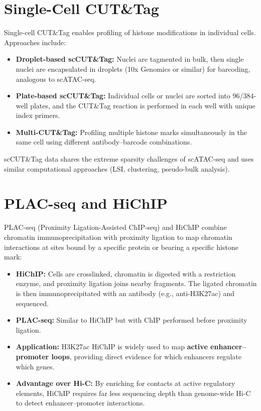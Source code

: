\section{Single-Cell CUT\&Tag}
\label{sec:histones:sc-cuttag}

Single-cell CUT\&Tag enables profiling of histone modifications in individual cells. Approaches include:

\begin{itemize}[itemsep=3pt]
  \item \textbf{Droplet-based scCUT\&Tag:} Nuclei are tagmented in bulk, then single nuclei are encapsulated in droplets (10x Genomics or similar) for barcoding, analogous to scATAC-seq.
  \item \textbf{Plate-based scCUT\&Tag:} Individual cells or nuclei are sorted into 96/384-well plates, and the CUT\&Tag reaction is performed in each well with unique index primers.
  \item \textbf{Multi-CUT\&Tag:} Profiling multiple histone marks simultaneously in the same cell using different antibody--barcode combinations.
\end{itemize}

scCUT\&Tag data shares the extreme sparsity challenges of scATAC-seq and uses similar computational approaches (LSI, clustering, pseudo-bulk analysis).

\section{PLAC-seq and HiChIP}
\label{sec:histones:plac-hichip}

PLAC-seq (Proximity Ligation-Assisted ChIP-seq) and HiChIP combine chromatin immunoprecipitation with proximity ligation to map chromatin interactions at sites bound by a specific protein or bearing a specific histone mark:

\begin{itemize}[itemsep=3pt]
  \item \textbf{HiChIP:} Cells are crosslinked, chromatin is digested with a restriction enzyme, and proximity ligation joins nearby fragments. The ligated chromatin is then immunoprecipitated with an antibody (e.g., anti-H3K27ac) and sequenced.
  \item \textbf{PLAC-seq:} Similar to HiChIP but with ChIP performed before proximity ligation.
  \item \textbf{Application:} H3K27ac HiChIP is widely used to map \textbf{active enhancer--promoter loops}, providing direct evidence for which enhancers regulate which genes.
  \item \textbf{Advantage over Hi-C:} By enriching for contacts at active regulatory elements, HiChIP requires far less sequencing depth than genome-wide Hi-C to detect enhancer--promoter interactions.
\end{itemize}

